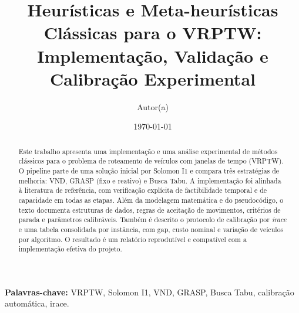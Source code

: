 \documentclass[10pt,a4paper]{article}
\begin{document}
\title{Heurísticas e Meta-heurísticas Clássicas para o VRPTW:\\Implementação, Validação e Calibração Experimental}
\author{Autor(a)}
\date{\today}
\maketitle

\begin{abstract}
Este trabalho apresenta uma implementação e uma análise experimental de métodos clássicos para o problema de roteamento de veículos com janelas de tempo (VRPTW). O pipeline parte de uma solução inicial por Solomon I1 e compara três estratégias de melhoria: VND, GRASP (fixo e reativo) e Busca Tabu. A implementação foi alinhada à literatura de referência, com verificação explícita de factibilidade temporal e de capacidade em todas as etapas. Além da modelagem matemática e do pseudocódigo, o texto documenta estruturas de dados, regras de aceitação de movimentos, critérios de parada e parâmetros calibráveis. Também é descrito o protocolo de calibração por \emph{irace} e uma tabela consolidada por instância, com gap, custo nominal e variação de veículos por algoritmo. O resultado é um relatório reprodutível e compatível com a implementação efetiva do projeto.
\end{abstract}

\noindent\textbf{Palavras-chave:} VRPTW, Solomon I1, VND, GRASP, Busca Tabu, calibração automática, irace.











   
\end{document}
